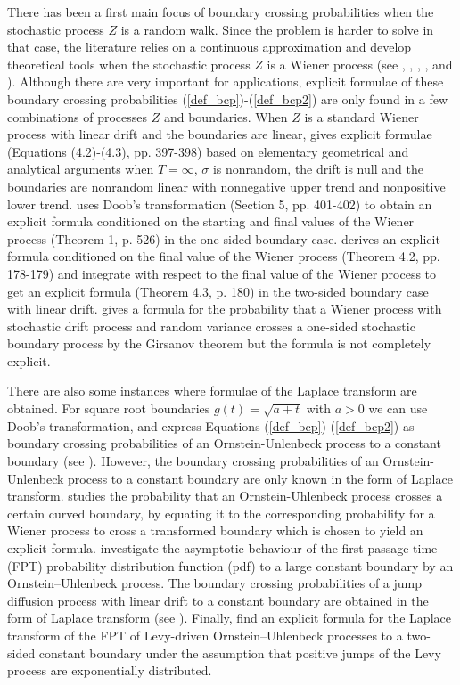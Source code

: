 \documentclass[aop]{imsart}
\theoremstyle{plain}
\theoremstyle{remark}
\begin{document}
There has been a first main focus of boundary crossing probabilities when the stochastic process $Z$ is a random walk. Since the problem is harder to solve in that case, the literature relies on a continuous approximation and develop theoretical tools when the stochastic process $Z$ is a Wiener process (see \cite{gut1974moments}, \cite{woodroofe1976renewal}, \cite{woodroofe1977second}, \cite{lai1977nonlinear}, \cite{lai1979nonlinear} and \cite{siegmund1986boundary}). Although there are very important for applications, explicit formulae of these boundary crossing probabilities (\ref{def_bcp})-(\ref{def_bcp2}) are only found in a few combinations of processes $Z$ and boundaries. When $Z$ is a standard Wiener process with linear drift and the boundaries are linear, \cite{doob1949heuristic} gives explicit formulae (Equations (4.2)-(4.3), pp. 397-398) based on elementary geometrical and analytical arguments when $T=\infty$, $\sigma$ is nonrandom, the drift is null and the boundaries are nonrandom linear with nonnegative upper trend and nonpositive lower trend. \cite{malmquist1954certain} uses Doob's transformation (Section 5, pp. 401-402) to obtain an explicit formula conditioned on the starting and final values of the Wiener process (Theorem 1, p. 526) in the one-sided boundary case. \cite{anderson1960modification} derives an explicit formula conditioned on the final value of the Wiener process (Theorem 4.2, pp. 178-179) and integrate with respect to the final value of the Wiener process to get an explicit formula (Theorem 4.3, p. 180) in the two-sided boundary case with linear drift. \cite{potiron2023formula} gives a formula for the probability that a Wiener process with stochastic drift process and random variance crosses a one-sided stochastic boundary process by the Girsanov theorem but the formula is not completely explicit.

There are also some instances where formulae of the Laplace transform are obtained. For square root boundaries $g(t) = \sqrt{a+ t}$ with $a >0$ we can use Doob's transformation, and express Equations (\ref{def_bcp})-(\ref{def_bcp2}) as boundary crossing probabilities of an Ornstein-Unlenbeck process to a constant boundary (see \cite{breiman1967first}). However, the boundary crossing probabilities of an Ornstein-Unlenbeck process to a constant boundary are only known in the form of Laplace transform. \cite{daniels1969minimum} studies the probability that an Ornstein-Uhlenbeck process crosses a certain curved boundary, by equating it to the corresponding probability for a Wiener process to cross a transformed boundary which is chosen to yield an explicit formula. \cite{nobile1985exponential} investigate the asymptotic behaviour of the first-passage time (FPT) probability distribution function (pdf) to a large constant boundary by an Ornstein–Uhlenbeck process. The boundary crossing probabilities of a jump diffusion process with linear drift to a constant boundary are obtained in the form of Laplace transform (see \cite{kou2003first}). Finally, \cite{borovkov2008exit} find an explicit formula for the Laplace transform of the FPT of Levy-driven Ornstein–Uhlenbeck processes to a two-sided constant boundary under the assumption that positive jumps of the Levy process are exponentially distributed. 
 
\end{document}
